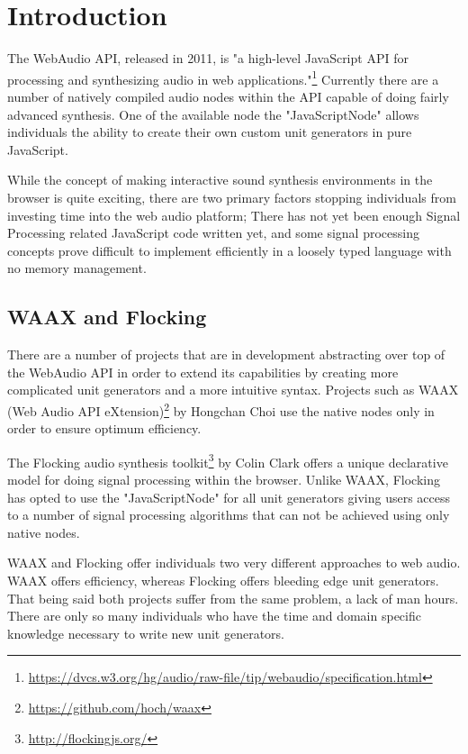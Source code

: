 \documentclass[runningheads,a4paper]{llncs}
\begin{document}
\section{Introduction}

The WebAudio API, released in 2011, is "a high-level JavaScript API for processing and synthesizing audio in web applications."\footnote{\url{https://dvcs.w3.org/hg/audio/raw-file/tip/webaudio/specification.html}}  Currently there are a number of natively compiled audio nodes within the API capable of doing fairly advanced synthesis. One of the available node the "JavaScriptNode" allows individuals the ability to create their own custom unit generators in pure JavaScript. 

While the concept of making interactive sound synthesis environments in the browser is quite exciting, there are two primary factors stopping individuals from investing time into the web audio platform; There has not yet been enough Signal Processing related JavaScript code written yet, and some signal processing concepts prove difficult to implement efficiently in a loosely typed language with no memory management.

\subsection{WAAX and Flocking}

There are a number of projects that are in development abstracting over top of the WebAudio API in order to extend its capabilities by creating more complicated unit generators and a more intuitive syntax.  Projects such as WAAX (Web Audio API eXtension)\footnote{\url{https://github.com/hoch/waax}} by Hongchan Choi use the native nodes only in order to ensure optimum efficiency.\cite{waax}

The Flocking audio synthesis toolkit\footnote{\url{http://flockingjs.org/}} by Colin Clark offers a unique declarative model for doing signal processing within the browser.  Unlike WAAX, Flocking has opted to use the "JavaScriptNode" for all unit generators giving users access to a number of signal processing algorithms that can not be achieved using only native nodes.

WAAX and Flocking offer individuals two very different approaches to web audio. WAAX offers efficiency, whereas Flocking offers bleeding edge unit generators.  That being said both projects suffer from the same problem, a lack of man hours.  There are only so many individuals who have the time and domain specific knowledge necessary to write new unit generators.
\end{document}
